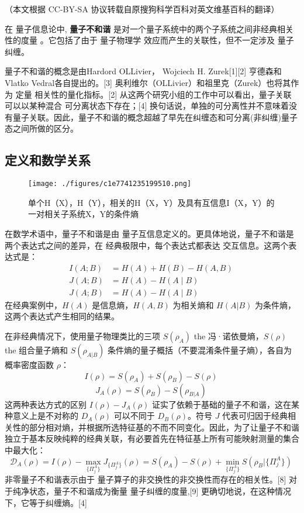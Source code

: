 
（本文根据 CC-BY-SA 协议转载自原搜狗科学百科对英文维基百科的翻译）

在 量子信息论中, \textbf{量子不和谐} 是对一个量子系统中的两个子系统之间非经典相关性的度量 。它包括了由于 量子物理学 效应而产生的关联性，但不一定涉及 量子纠缠。

量子不和谐的概念是由Hardord OLLivier， Wojciech H. Zurek[1][2] 亨德森和 Vlatko Vedral各自提出的。[3] 奥利维尔（OLLivier）和祖里克（Zurek）也将其作为 定量 相关性的量化指标。[2] 从这两个研究小组的工作中可以看出，量子关联可以以某种混合 可分离状态下存在；[4] 换句话说，单独的可分离性并不意味着没有量子关联。因此，量子不和谐的概念超越了早先在纠缠态和可分离(非纠缠)量子态之间所做的区分。

\subsection{定义和数学关系}
\begin{figure}[ht]
\centering
\texttt{[image: ./figures/c1e7741235199510.png]}
\caption{单个H（X），H（Y），相关的H（X，Y）及具有互信息I（X，Y）的一对相关子系统X，Y的条件熵} \label{fig_LZBHX_1}
\end{figure}
在数学术语中，量子不和谐是由 量子互信息定义的。更具体地说，量子不和谐是两个表达式之间的差异，在 经典极限中，每个表达式都表达 交互信息。这两个表达式是：
\begin{equation}
\begin{aligned}
I(A; B) &= H(A) + H(B) - H(A, B) \\
J(A; B) &= H(A) - H(A \mid B) \\
J(A; B) &= H(A) - H(A \mid B)
\end{aligned}~
\end{equation}
在经典案例中，$H(A)$ 是信息熵，$H(A, B)$ 为相关熵和 $H(A|B)$ 为条件熵，这两个表达式产生相同的结果。

在非经典情况下，使用量子物理类比的三项 $S(\rho_A)$ the 冯·诺依曼熵，$S(\rho)$ the 组合量子熵和 $S(\rho_{A|B})$ 条件熵的量子概括（不要混淆条件量子熵），各自为概率密度函数 $\rho$：
$$I(\rho) = S(\rho_A) + S(\rho_B) - S(\rho)~$$
$$J_A(\rho) = S(\rho_B) - S(\rho_{B|A})~$$
这两种表达方式的区别 $I(\rho) - J_A(\rho)$ 证实了依赖于基础的量子不和谐，这在某种意义上是不对称的 $D_A(\rho)$ 可以不同于 $D_B(\rho)$。符号 $J$ 代表可归因于经典相关性的部分相对熵，并根据所选特征基的不而不同变化。因此，为了让量子不和谐独立于基本反映纯粹的经典关联，有必要首先在特征基上所有可能映射测量的集合中最大化：
$$\mathcal{D}_A(\rho) = I(\rho) - \max_{\{\Pi_j^A\}} J_{\{\Pi_j^A\}} (\rho) = S(\rho_A) - S(\rho) + \min_{\{\Pi_j^A\}} S(\rho_B|\{\Pi_j^A\})~$$
非零量子不和谐表示由于 量子算子的非交换性的非交换性而存在的相关性。[8] 对于纯净状态，量子不和谐成为衡量 量子纠缠的度量,[9] 更确切地说，在这种情况下，它等于纠缠熵。[4]

